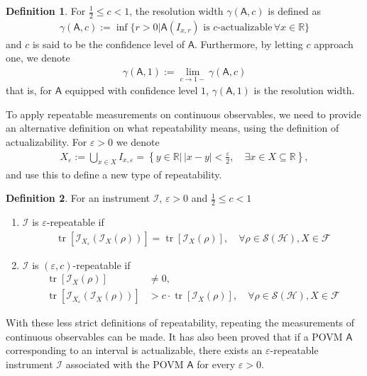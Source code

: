 \documentclass[a4paper,12pt]{wihuri}
\theoremstyle{definition}
\newtheorem{definition}{Definition}
\numberwithin{definition}{section}
\numberwithin{example}{section}
\numberwithin{theorem}{section}
\numberwithin{proposition}{section}
\numberwithin{lemma}{section}
\newcommand{\I}{\mathcal{I}}%
\newcommand{\hi}{\mathcal{H}}%
\newcommand{\salg}{\mathcal{F}}%
\newcommand{\tila}{\mathcal{S}}%
\newcommand{\A}{\mathsf{A}}%
\DeclareMathOperator{\tr}{tr}
\begin{document}

\begin{definition}
For $\frac{1}{2} \leq c < 1$, the resolution width $\gamma(\A,c)$ is defined as
\begin{align*}
\gamma(\A,c) := \inf\{r > 0 | \A(I_{x,r}) \text{ is } c\text{-actualizable}\, \forall x \in \mathbb{R}  \}
\end{align*}
and $c$ is said to be the confidence level of $\A$. Furthermore, by letting $c$ approach one, we denote
\begin{align*}
\gamma(\A, 1) := \lim_{c\rightarrow 1-}\gamma(\A, c)
\end{align*}
that is, for $\A$ equipped with confidence level $1$, $\gamma(\A, 1)$ is the resolution width.
\end{definition}
To apply repeatable measurements on continuous observables, we need to provide an alternative definition on what repeatability means, using the definition of actualizability. For $\varepsilon > 0$ we denote
\begin{align*}
X_\varepsilon := \bigcup_{x\in X} I_{x,\varepsilon} = \left\{y \in \mathbb{R}|\, |x-y| < \frac{\varepsilon}{2}, \quad \exists x \in X \subseteq \mathbb{R} \right\},
\end{align*}
and use this to define a new type of repeatability.

\begin{definition}
For an instrument $\I$, $\varepsilon > 0$ and $\frac{1}{2} \leq c < 1$
\begin{enumerate}[1)]
\item $\I$ is $\varepsilon$-repeatable if
\begin{align*}
\tr[\I_{X_\varepsilon}(\I_X(\rho))] = \tr[\I_X(\rho)], \quad \forall \rho \in \tila(\hi), X \in \salg
\end{align*}
\item $\I$ is $(\varepsilon, c)$-repeatable if
\begin{align*}
\tr[\I_X(\rho)] &\neq 0, \\
\tr[\I_{X_\varepsilon}(\I_X(\rho))] &> c\cdot\tr[\I_X(\rho)], \quad \forall \rho \in \tila(\hi), X \in \salg
\end{align*}
\end{enumerate}
\end{definition}
With these less strict definitions of repeatability, repeating the measurements of continuous observables can be made. It has also been proved that if a POVM $\A$ corresponding to an interval is actualizable, there exists an $\varepsilon$-repeatable instrument $\I$ associated with the POVM $\A$ for every $\varepsilon > 0$\cite{davies1970}.
\end{document}
